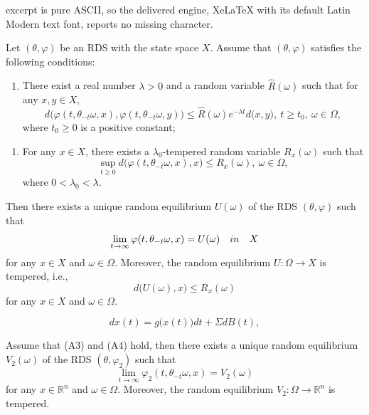 \documentclass[10pt,a4paper]{amsart}
\begin{document}
excerpt is pure ASCII, so the delivered engine, XeLaTeX with its default Latin Modern text font, reports no missing character.
\begin{theorem}\label{thm1} Let $(\theta,\varphi)$ be an RDS with the state space $X$.
Assume that $(\theta,\varphi)$ satisfies the following conditions:
\begin{enumerate}[{\rm(H1)}]
\item There exist a real number $\lambda>0$ and a random variable $\widehat{R}(\omega)$ such that for any $x,y\in X$,
\begin{equation}\label{H1}
d\bigl(\varphi(t,\theta_{-t}\omega,x),\varphi(t,\theta_{-t}\omega,y)\bigr)\leq\widehat{R}(\omega)e^{-\lambda t}d\bigl(x,y\bigr),\ t\geq t_0,\ \omega\in\Omega,
\end{equation}
where $t_0\geq0$ is a positive constant;
\end{enumerate}

\begin{enumerate}[{\rm(H2)}]
\item For any $x\in X$, there exists a $\lambda_0$-tempered random variable $R_x(\omega)$ such that
\begin{equation}\label{H2}
\sup_{t\geq0}d\bigl(\varphi(t,\theta_{-t}\omega,x),x\bigr)\leq R_x(\omega),\ \omega\in\Omega,
\end{equation}
where $0<\lambda_0<\lambda$.
\end{enumerate}
Then there exists a unique random equilibrium $U(\omega)$ of the RDS $(\theta,\varphi)$ such that
\begin{equation}\label{Conclu1}
\lim_{t\rightarrow\infty}\varphi(t,\theta_{-t}\omega,x)=U(\omega)\quad {\rm in}\quad X
\end{equation}
for any $x\in X$ and $\omega\in\Omega$. Moreover, the random equilibrium $U:\Omega\rightarrow X$ is tempered, i.e.,
\begin{equation}\label{Conclu2}
d\bigl(U(\omega),x\bigr)\leq R_x(\omega)
\end{equation}
for any $x\in X$ and $\omega\in\Omega$.
\end{theorem}

\begin{equation}\label{SDE2-1}
  dx(t)=g\bigl(x(t)\bigr)dt+\Sigma dB(t),
\end{equation}

\begin{theorem}\label{thm3} Assume that (A3) and (A4) hold, then there exists a unique random equilibrium $V_2(\omega)$ of the RDS $(\theta,\varphi_2)$ such that
\begin{equation}\label{eq30}
\lim_{t\rightarrow\infty}\varphi_2(t,\theta_{-t}\omega,x)=V_2(\omega)
\end{equation}
for any $x\in\mathbb{R}^n$ and $\omega\in\Omega$. Moreover, the random equilibrium $V_2:\Omega\rightarrow\mathbb{R}^n$ is tempered.
\end{theorem}
\end{document}
